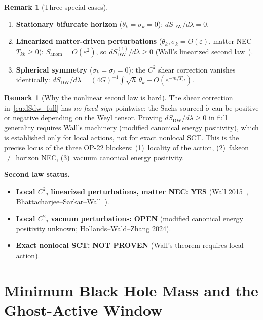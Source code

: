 \documentclass[11pt,a4paper]{article}
\theoremstyle{plain}
\theoremstyle{definition}
\newtheorem{remark}[theorem]{Remark}
\begin{document}
\begin{remark}[Three special cases]
\leavevmode
\begin{enumerate}
  \item \textbf{Stationary bifurcate horizon}
    ($\theta_k = \sigma_k = 0$): $dS_{\mathrm{DW}}/d\lambda = 0$.
  \item \textbf{Linearized matter-driven perturbations}
    ($\theta_k, \sigma_k = O(\varepsilon)$, matter NEC $T_{kk} \geq 0$):
    $S_{\mathrm{anom}} = O(\varepsilon^2)$, so
    $dS_{\mathrm{DW}}^{(1)}/d\lambda \geq 0$
    (Wall's linearized second law~\cite{Wall2015}).
  \item \textbf{Spherical symmetry}
    ($\sigma_k = \sigma_\ell = 0$): the $C^2$ shear correction
    vanishes identically:
    $dS_{\mathrm{DW}}/d\lambda
    = (4G)^{-1}\!\int\!\sqrt{h}\,\theta_k
    + O(e^{-m/T_H})$.
\end{enumerate}
\end{remark}

\begin{remark}[Why the nonlinear second law is hard]
  The shear correction in~\eqref{eq:dSdw_full} has
  \emph{no fixed sign} pointwise: the Sachs-sourced $\dot\sigma$
  can be positive or negative depending on the Weyl tensor.
  Proving $dS_{\mathrm{DW}}/d\lambda \geq 0$ in full generality
  requires Wall's machinery (modified canonical energy positivity),
  which is established only for local actions, not for
  exact nonlocal SCT.
  This is the precise locus of the three OP-22 blockers:
  (1)~locality of the action, (2)~fakeon $\neq$ horizon NEC,
  (3)~vacuum canonical energy positivity.
\end{remark}

\medskip\noindent\textbf{Second law status.}
\begin{itemize}
  \item \textbf{Local $C^2$, linearized perturbations, matter NEC:}
    \textbf{YES} (Wall 2015~\cite{Wall2015},
    Bhattacharjee--Sarkar--Wall~\cite{DongWall}).
  \item \textbf{Local $C^2$, vacuum perturbations:}
    \textbf{OPEN} (modified canonical energy positivity unknown;
    Hollands--Wald--Zhang 2024).
  \item \textbf{Exact nonlocal SCT:}
    \textbf{NOT PROVEN} (Wall's theorem requires local action).
\end{itemize}


\section{Minimum Black Hole Mass and the Ghost-Active Window}%
\label{sec:mmin}
\end{document}

